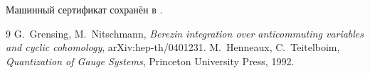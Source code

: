 Машинный сертификат сохранён в
.

\begin{thebibliography}{9}
G.~Grensing, M.~Nitschmann,
\emph{Berezin integration over anticommuting variables and cyclic
cohomology}, arXiv:hep-th/0401231.
M.~Henneaux, C.~Teitelboim,
\emph{Quantization of Gauge Systems},
Princeton University Press, 1992.
\end{thebibliography}